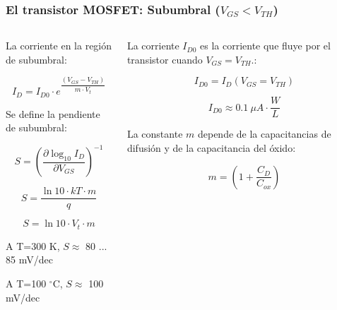 \begin{frame}[t]
    \frametitle{El transistor MOSFET: Subumbral ($V_{GS}<V_{TH}$)}

    \begin{columns}
        \begin{column}{0.5\textwidth}
            La corriente en la región de subumbral:

            \[ I_D = I_{D0} \cdot e^{\dfrac{(V_{GS}-V_{TH})}{m \cdot V_t}} \]

            Se define la pendiente de subumbral:

            \[ S = \left( \dfrac{\partial \log_{10} I_D}{\partial V_{GS}} \right)^{-1} \]

            \[ S = \dfrac{\ln 10 \cdot kT \cdot m}{q} \]

            \[ S = \ln 10 \cdot V_t \cdot m \]

            \vspace{3mm}
            A T=300 K, $S\approx$ 80 ... 85 mV/dec

            A T=100 $^\circ$C, $S\approx$ 100 mV/dec
        \end{column}
        \begin{column}{0.5\textwidth}
            La corriente $I_{D0}$ es la corriente que fluye por el transistor cuando $V_{GS}=V_{TH}$.:

            \[ I_{D0} = I_D (V_{GS} = V_{TH}) \]

            \[ I_{D0} \approx 0.1\ \mu A \cdot \dfrac{W}{L} \]

            \vspace{3mm}
            La constante $m$ depende de la capacitancias de difusión y de la capacitancia del óxido:

            \[ m = \left( 1 + \dfrac{C_D}{C_{ox}} \right) \]
        \end{column}
    \end{columns}
\end{frame}


